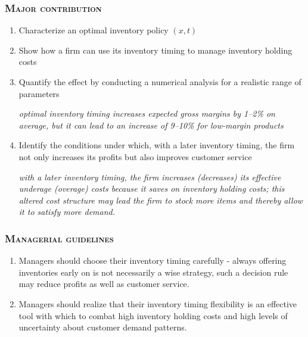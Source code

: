 \documentclass[aspectratio=169]{../presentation}
\begin{document}
    \begin{frame}
        \frametitle{\textsc{Major contribution}}

        \begin{enumerate}
            \item Characterize an optimal inventory policy $(x, t)$
            \item Show how a firm can use its inventory timing to manage inventory holding costs
            \item Quantify the effect by conducting a numerical analysis for a realistic range of parameters

            {
                \scriptsize \textsl{
                optimal inventory timing increases expected gross margins by 1–2\% on average, but it can lead to an increase of 9–10\% for low-margin products}
            }

            \item Identify the conditions under which, with a later inventory timing, the firm not only increases its profits but also improves customer service

            {
                \scriptsize \textsl{
                with a later inventory timing, the firm increases (decreases) its effective underage (overage) costs because it saves on inventory holding costs; this altered cost structure may lead the firm to stock more items and thereby allow it to satisfy more demand.}
            }
        \end{enumerate}

    \end{frame}

    \begin{frame}
        \frametitle{\textsc{Managerial guidelines}}

        \begin{enumerate}
            \item Managers should choose their inventory timing carefully - always offering inventories early on is not necessarily a wise strategy, such a decision rule may reduce profits as well as customer service.
            \item Managers should realize that their inventory timing flexibility is an effective tool with which to combat high inventory holding costs and high levels of uncertainty about customer demand patterns.
        \end{enumerate}

    \end{frame}
\end{document}
